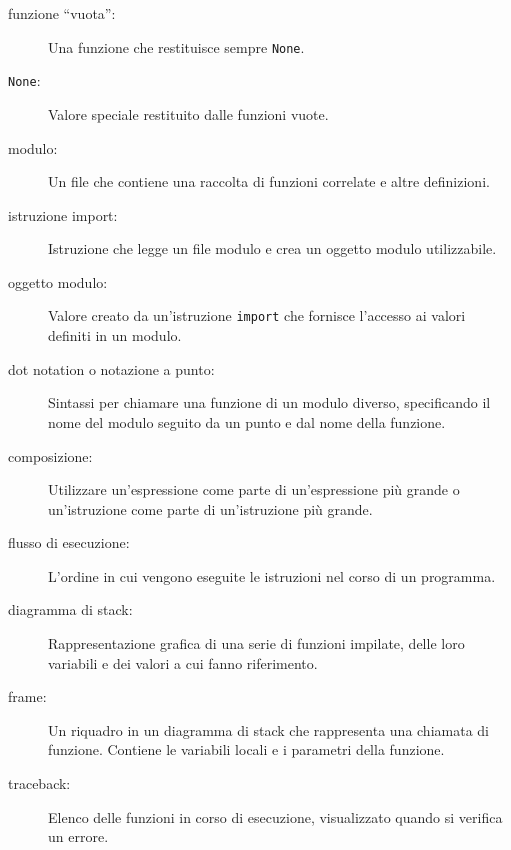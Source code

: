 \documentclass[10pt]{book}
\begin{document}
\begin{description}
\item[funzione ``vuota'':] Una funzione che restituisce sempre {\tt None}.

\item[{\tt None}:]  Valore speciale restituito dalle funzioni vuote.

\item[modulo:] Un file che contiene una raccolta di funzioni correlate e altre definizioni.

\item[istruzione import:] Istruzione che legge un file modulo e crea un oggetto modulo utilizzabile.

\item[oggetto modulo:] Valore creato da un'istruzione {\tt import} che fornisce l'accesso ai valori definiti in un modulo.

\item[dot notation o notazione a punto:]  Sintassi per chiamare una funzione di un modulo diverso, specificando il nome del modulo seguito da un punto e dal nome della funzione.

\item[composizione:] Utilizzare un'espressione come parte di un'espressione più grande o un'istruzione come parte di un'istruzione più grande.

\item[flusso di esecuzione:]  L'ordine in cui vengono eseguite le istruzioni nel corso di un programma.

\item[diagramma di stack:]  Rappresentazione grafica di una serie di funzioni impilate, delle loro variabili e dei valori a cui fanno riferimento.

\item[frame:]  Un riquadro in un diagramma di stack che rappresenta una chiamata di funzione. Contiene le variabili locali e i parametri della funzione.

\item[traceback:]  Elenco delle funzioni in corso di esecuzione, visualizzato quando si verifica un errore.


\end{description}
\end{document}
